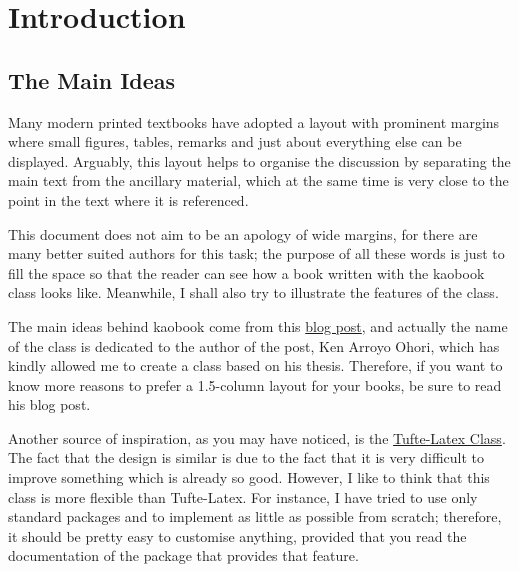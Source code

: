 \setchapterpreamble[u]{\margintoc}
\chapter{Introduction}

\section{The Main Ideas}

Many modern printed textbooks have adopted a layout with prominent 
margins where small figures, tables, remarks and just about everything 
else can be displayed. Arguably, this layout helps to organise the 
	discussion by separating the main text from the ancillary material, 
	which at the same time is very close to the point in the text where 
	it is referenced.

This document does not aim to be an apology of wide margins, for there 
are many better suited authors for this task; the purpose of all these 
words is just to fill the space so that the reader can see how a book 
written with the kaobook class looks like. Meanwhile, I shall also try 
to illustrate the features of the class.

The main ideas behind kaobook come from this 
\href{https://3d.bk.tudelft.nl/ken/en/2016/04/17/a-1.5-column-layout-in-latex.html}{blog 
	post}, and actually the name of the class is dedicated to the author 
of the post, Ken Arroyo Ohori, which has kindly allowed me to create a 
class based on his thesis. Therefore, if you want to know more reasons 
to prefer a 1.5-column layout for your books, be sure to read his blog 
post.

Another source of inspiration, as you may have noticed, is the 
\href{https://github.com/Tufte-LaTeX/tufte-latex}{Tufte-Latex Class}. 
The fact that the design is similar is due to the fact that it is very 
difficult to improve something which is already so good. However, I like 
to think that this class is more flexible than Tufte-Latex. For 
instance, I have tried to use only standard packages and to implement as 
little as possible from scratch; therefore, it should be pretty easy 
to customise anything, provided that you read the documentation of the 
package that provides that feature.

